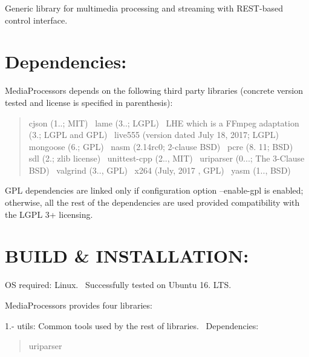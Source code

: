 Generic library for multimedia processing and streaming with R\+E\+S\+T-\/based control interface.

\section*{Dependencies\+: }

Media\+Processors depends on the following third party libraries (concrete version tested and license is specified in parenthesis)\+:

\begin{quote}
cjson (1..; M\+IT)~\newline
 lame (3..; L\+G\+PL)~\newline
 L\+HE which is a F\+Fmpeg adaptation (3.; L\+G\+PL and G\+PL)~\newline
 live555 (version dated July 18, 2017; L\+G\+PL)~\newline
 mongoose (6.; G\+PL)~\newline
 nasm (2.\+14rc0; 2-\/clause B\+SD)~\newline
 pcre (8. 11; B\+SD)~\newline
 sdl (2.; zlib license)~\newline
 unittest-\/cpp (2.., M\+IT)~\newline
 uriparser (0...; The 3-\/\+Clause B\+SD)~\newline
 valgrind (3.., G\+PL)~\newline
 x264 (July, 2017 , G\+PL)~\newline
 yasm (1.., B\+SD)~\newline
 \end{quote}


G\+PL dependencies are linked only if configuration option --enable-\/gpl is enabled; otherwise, all the rest of the dependencies are used provided compatibility with the L\+G\+PL 3+ licensing.

\section*{B\+U\+I\+LD \& I\+N\+S\+T\+A\+L\+L\+A\+T\+I\+ON\+: }

OS required\+: Linux.~\newline
 Successfully tested on Ubuntu 16. L\+TS.

Media\+Processors provides four libraries\+:

1.-\/ utils\+: Common tools used by the rest of libraries.~\newline
 Dependencies\+: \begin{quote}
uriparser \end{quote}


